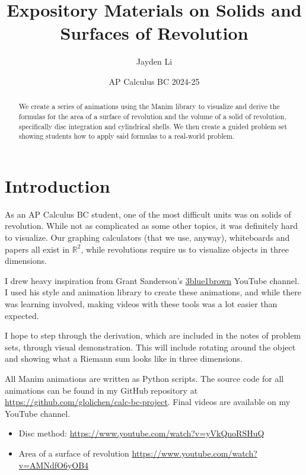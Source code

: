 \documentclass{article}
\title{\vspace*{-40pt} Expository Materials on Solids and Surfaces of Revolution}
\author{Jayden Li}
\date{AP Calculus BC 2024-25}
\begin{document}
\fontsize{11pt}{12pt}\selectfont
\setlength{\abovedisplayskip}{\abovedisplayskip/2}
\setlength{\belowdisplayskip}{\belowdisplayskip/2}
\setlength{\parindent}{0pt}
\setlength{\parskip}{2ex plus 0.5ex minus 0.2ex}
\maketitle

\begin{abstract}
	We create a series of animations using the Manim library to visualize and derive the formulas for the area of a surface of revolution and the volume of a solid of revolution, specifically disc integration and cylindrical shells. We then create a guided problem set showing students how to apply said formulas to a real-world problem.
\end{abstract}

\section{Introduction}

As an AP Calculus BC student, one of the most difficult units was on solids of revolution. While not as complicated as some other topics, it was definitely hard to visualize. Our graphing calculators (that we use, anyway), whiteboards and papers all exist in $\mathbb R^2$, while revolutions require us to visualize objects in three dimensions.

I drew heavy inspiration from Grant Sanderson's \href{https://www.youtube.com/c/3blue1brown}{3blue1brown} YouTube channel. I used his style and animation library to create these animations, and while there was learning involved, making videos with these tools was a lot easier than expected.

I hope to step through the derivation, which are included in the notes of problem sets, through visual demonstration. This will include rotating around the object and showing what a Riemann sum looks like in three dimensions.

All Manim animations are written as Python scripts. The source code for all animations can be found in my GitHub repository at \url{https://github.com/glolichen/calc-bc-project}. Final videos are available on my YouTube channel.
\begin{itemize}[topsep=0pt]
	\item Disc method: \url{https://www.youtube.com/watch?v=yVkQnoRSHuQ}
	\item Area of a surface of revolution \url{https://www.youtube.com/watch?v=AMNdfO6yOB4}
\end{itemize}
\end{document}
